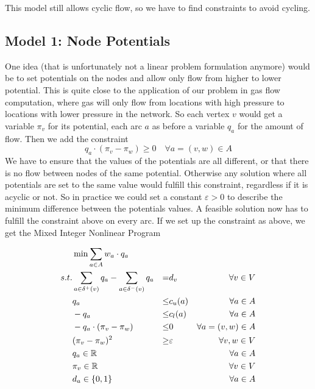 This model still allows cyclic flow, so we have to find constraints to avoid cycling. 
\subsection{Model 1: Node Potentials}
\label{model:nodePotential}

One idea (that is unfortunately not a linear problem formulation anymore) would be to set potentials on the nodes and 
allow only flow from higher to lower potential. This is quite close to the application of our problem in gas flow 
computation, where gas will only flow from locations with high pressure to locations with lower pressure in the 
network. So 
each vertex $v$ would get a variable $\pi_v$ for its potential, each arc $a$ as before a variable $q_a$ for the amount 
of flow. Then we add the constraint $$q_a\cdot (\pi_v -\pi_w)\ge 0\quad\forall a=(v,w)\in A $$
We have to ensure that the values of the potentials are all 
different, or that there is no flow between nodes of the same potential. Otherwise any solution where all potentials 
are set to the same value would fulfill this constraint, regardless if it is acyclic or not. So in practice we could 
set a constant $\varepsilon > 0$ to describe the minimum difference between the potentials values. A feasible 
solution now has to fulfill the constraint above on every arc. If we set up the constraint as above, we get the Mixed 
Integer Nonlinear Program

\begin{align*}\label{model:nodePotentialQuadratic}
  &\min \sum_{a\in A} w_a\cdot q_a & \\
 s.t. & \sum_{a\in \delta^+(v)}q_a - \sum_{a\in\delta^- (v)}q_a &=& d_v\ &\forall v\in V \\
 & q_a &\le& c_u(a) & \forall a\in A\\
 & -q_a &\le& c_l(a) & \forall a\in A\\
 & -q_a\cdot (\pi_v -\pi_w)&\le& 0 &\forall a=(v,w)\in A\\
 & (\pi_v - \pi_w)^2 &\ge& \varepsilon &\forall v,w \in V\\
 & q_a \in \mathbb{R} & & &\forall a\in A\\
 & \pi_v \in \mathbb{R} & & & \forall v\in V\\
 & d_a \in \{0,1\} & & &\forall a\in A\\
\end{align*}

